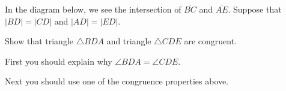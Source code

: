 \documentclass[noauthor,nooutcomes,12pt,hints]{ximera}
\begin{document}
\begin{problem}\label{18} 
  In the diagram below, we see the intersection of $\bar{BC}$ and
  $\bar{AE}$. Suppose that $\left\vert BD\right\vert =\left\vert
  CD\right\vert $ and $\left\vert AD\right\vert =\left\vert
  ED\right\vert $.
  \begin{image}
  \end{image}

  
  Show that triangle $\triangle BDA$ and triangle $\triangle CDE$ are
  congruent.

  \begin{hint}
    First you should explain why $\angle BDA = \angle CDE$.
  \end{hint}
  \begin{hint}
    Next you should use one of the congruence properties above. 
  \end{hint}
        
        
        
        

\end{problem}
\end{document}
